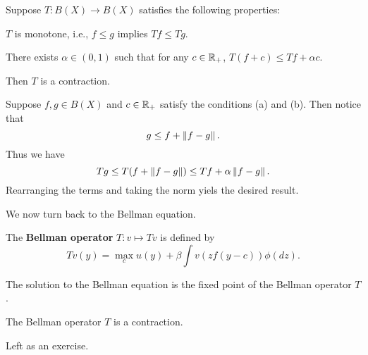 \documentclass[12pt]{article}
\begin{document}
\begin{theorem}
    Suppose $T: B(X) \to B(X)$ satisfies the following properties: 
    \begin{thmenum}
        \item $T$ is monotone, i.e., $f \leq g$ implies $Tf \leq Tg$.
        \item There exists $\alpha\in (0,1)$ such that for any 
        $c\in \mathbb{R}_+$, $T(f+c) \leq Tf + \alpha c$.
    \end{thmenum}
    Then $T$ is a contraction.
\end{theorem}
\begin{pf}
    Suppose $f, g \in B(X)$ and $c\in\mathbb{R}_+$ satisfy the conditions 
    (a) and (b). Then notice that
    \begin{equation}
        g \leq f + \left\lVert {f-g} \right\rVert.
    \end{equation}
    Thus we have 
    \begin{equation}
        Tg \leq T(f + \left\lVert {f-g} \right\rVert) \leq Tf + \alpha\left\lVert {f-g} \right\rVert.
    \end{equation}
    Rearranging the terms and taking the norm yiels the 
    desired result.
\end{pf}

We now turn back to the Bellman equation. 

\begin{definition}
    The \textbf{Bellman operator} $T: v \mapsto Tv$ is defined by 
    \begin{equation}
        Tv(y) = \max_{c} u(y) + \beta\int v(zf(y-c))\phi(dz).
    \end{equation}
\end{definition}
\begin{remark}
    The solution to the Bellman equation is the fixed point of the 
    Bellman operator $T$.
\end{remark}

\begin{corollary}
    The Bellman operator $T$ is a contraction.
\end{corollary}
\begin{pf}
    Left as an exercise.
\end{pf}
\end{document}
